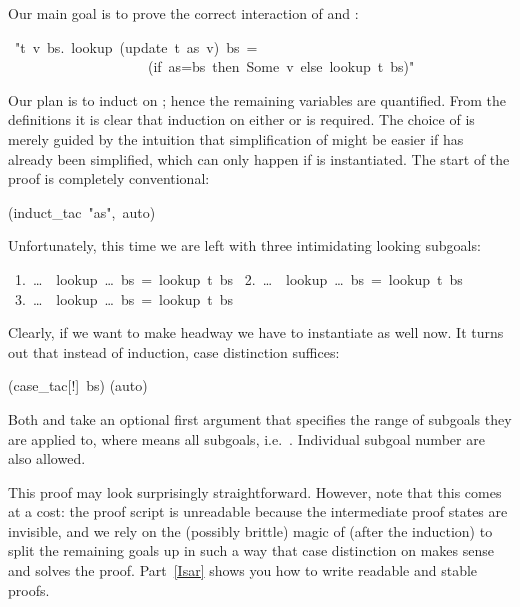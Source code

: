 \begin{isabelle}
\begin{isamarkuptext}
Our main goal is to prove the correct interaction of  and
:%
\end{isamarkuptext}%
~{"}{\isasymforall}t~v~bs.~lookup~(update~t~as~v)~bs~=\isanewline
~~~~~~~~~~~~~~~~~~~~(if~as=bs~then~Some~v~else~lookup~t~bs){"}%
\begin{isamarkuptxt}%
\noindent
Our plan is to induct on ; hence the remaining variables are
quantified. From the definitions it is clear that induction on either
 or  is required. The choice of  is merely
guided by the intuition that simplification of  might be easier
if  has already been simplified, which can only happen if
 is instantiated.
The start of the proof is completely conventional:%
\end{isamarkuptxt}%
(induct\_tac~{"}as{"},~auto)%
\begin{isamarkuptxt}%
\noindent
Unfortunately, this time we are left with three intimidating looking subgoals:
\begin{isabellepar}%
~1.~\dots~{\isasymLongrightarrow}~lookup~\dots~bs~=~lookup~t~bs\isanewline
~2.~\dots~{\isasymLongrightarrow}~lookup~\dots~bs~=~lookup~t~bs\isanewline
~3.~\dots~{\isasymLongrightarrow}~lookup~\dots~bs~=~lookup~t~bs%
\end{isabellepar}%
Clearly, if we want to make headway we have to instantiate  as
well now. It turns out that instead of induction, case distinction
suffices:%
\end{isamarkuptxt}%
(case\_tac[!]~bs)\isanewline
{}(auto)%
\begin{isamarkuptext}%
\noindent
Both  and 
take an optional first argument that specifies the range of subgoals they are
applied to, where \isa{!} means all subgoals, i.e.\ \isa{[1-3]}. Individual
subgoal number are also allowed.

This proof may look surprisingly straightforward. However, note that this
comes at a cost: the proof script is unreadable because the
intermediate proof states are invisible, and we rely on the (possibly
brittle) magic of  (after the induction) to split the remaining
goals up in such a way that case distinction on  makes sense and
solves the proof. Part~\ref{Isar} shows you how to write readable and stable
proofs.%
\end{isamarkuptext}%
\end{isabelle}%
